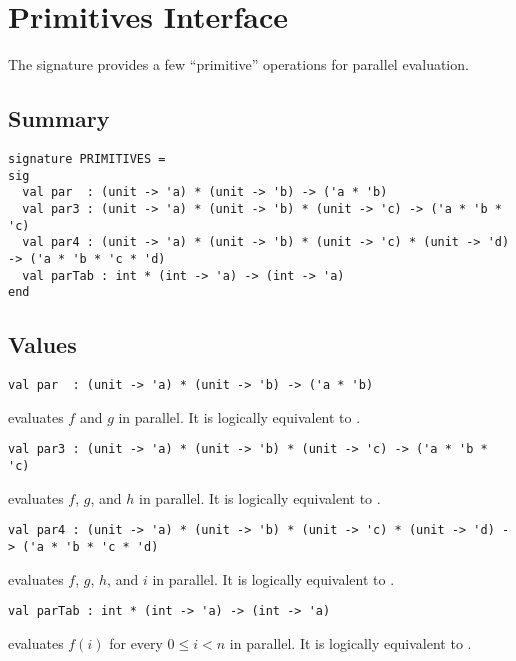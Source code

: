 \chapter{Primitives Interface}
\label{ch:primitives-interface}

\begin{preamble}
  The  signature provides a few ``primitive'' operations for parallel evaluation.
\end{preamble}

\section{Summary}
\begin{gram}
\begin{verbatim}
signature PRIMITIVES =
sig
  val par  : (unit -> 'a) * (unit -> 'b) -> ('a * 'b)
  val par3 : (unit -> 'a) * (unit -> 'b) * (unit -> 'c) -> ('a * 'b * 'c)
  val par4 : (unit -> 'a) * (unit -> 'b) * (unit -> 'c) * (unit -> 'd) -> ('a * 'b * 'c * 'd)
  val parTab : int * (int -> 'a) -> (int -> 'a)
end  
\end{verbatim}
\end{gram}

\section{Values}
\begin{gram}[par]
\label{gr:primitives-interface:par}
\begin{verbatim}
val par  : (unit -> 'a) * (unit -> 'b) -> ('a * 'b)
\end{verbatim}
 evaluates $f$ and $g$ in parallel. It is logically equivalent to .
\end{gram}

\begin{gram}[par3]
\label{gr:primitives-interface:par3}
\begin{verbatim}
val par3 : (unit -> 'a) * (unit -> 'b) * (unit -> 'c) -> ('a * 'b * 'c)
\end{verbatim}
 evaluates $f$, $g$, and $h$ in parallel. It is logically equivalent to .
\end{gram}

\begin{gram}[par4]
\label{gr:primitives-interface:par4}
\begin{verbatim}
val par4 : (unit -> 'a) * (unit -> 'b) * (unit -> 'c) * (unit -> 'd) -> ('a * 'b * 'c * 'd)
\end{verbatim}
 evaluates $f$, $g$, $h$, and $i$ in parallel. It is logically equivalent to .
\end{gram}

\begin{gram}[parTab]
\label{gr:primitives-interface:parTab}
\begin{verbatim}
val parTab : int * (int -> 'a) -> (int -> 'a)
\end{verbatim}
 evaluates $f(i)$ for every $0 \le i < n$ in parallel. It is logically equivalent to .
\end{gram}